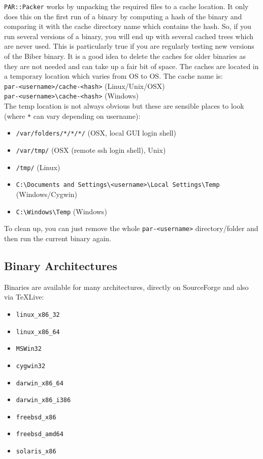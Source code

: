 \documentclass{ltxdockit}
\begin{document}
\verb+PAR::Packer+ works by unpacking the required files to a cache
location. It only does this on the first run of a binary 
by computing a hash of the binary and comparing it with
the cache directory name which contains the hash. So, if you run
several versions of a binary, you will end up with several cached
trees which are never used. This is particularly true if you are regularly
testing new versions of the Biber binary. It is a good idea to
delete the caches for older binaries as they are not needed and can take up
a fair bit of space. The caches are located in a temporary location which
varies from OS to OS. The cache name is:\\[1ex]

\noindent\verb+par-<username>/cache-<hash>+ (Linux/Unix/OSX)\\
\verb+par-<username>\cache-<hash>+ (Windows)\\[1ex]

\noindent The temp location is not always obvious but these are sensible
places to look (where \verb+*+ can vary depending on username):

\begin{itemize}
\item \verb+/var/folders/*/*/*/+ (OSX, local GUI login shell)
\item \verb+/var/tmp/+ (OSX (remote ssh login shell), Unix)
\item \verb+/tmp/+ (Linux)
\item \verb+C:\Documents and Settings\<username>\Local Settings\Temp+ (Windows/Cygwin)
\item \verb+C:\Windows\Temp+ (Windows)
\end{itemize}

\noindent To clean up, you can just remove the whole \verb+par-<username>+
directory/folder and then run the current binary again.

\subsection{Binary Architectures}

Binaries are available for many architectures, directly on SourceForge and
also via \TeX Live:

\begin{itemize}
\item \verb+linux_x86_32+
\item \verb+linux_x86_64+
\item \verb+MSWin32+
\item \verb+cygwin32+
\item \verb+darwin_x86_64+
\item \verb+darwin_x86_i386+
\item \verb+freebsd_x86+\tpb
\item \verb+freebsd_amd64+\tpb
\item \verb+solaris_x86+\tpb
\end{itemize}
\end{document}
